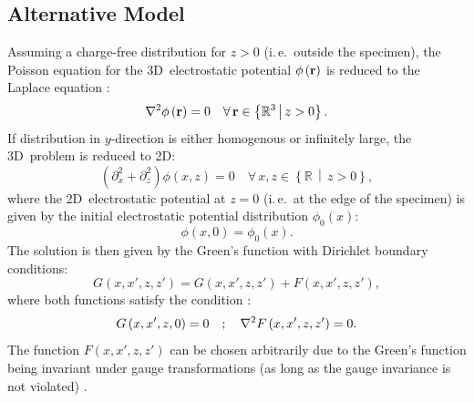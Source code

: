 \subsection{Alternative Model} \label{ssec:SIMP-alternative-model}
Assuming a charge-free distribution for $z > 0$ (i.\,e.\ outside the specimen), the Poisson equation for the 3D~electrostatic potential $\phi\left(\vb{r}\right)$ is reduced to the Laplace equation \cite{Jackson1999}:
\begin{equation}
  \laplacian{\phi\left(\vb{r}\right)} = 0 \quad \forall\, \vb{r} \in \left\{\mathbb{R}^3\, \middle| \, z > 0\right\}.
\end{equation}
If distribution in $y$-direction is either homogenous or infinitely large, the 3D~problem is reduced to 2D:
\begin{equation}
	\label{eq:poisson-equation-2D-approximation}
  \left(\partial^2_x + \partial^2_z\right)\phi\left(x, z \right) = 0 \quad \forall\, x, z \in \left\{\mathbb{R}\, \middle| \, z > 0\right\},
\end{equation}
where the 2D~electrostatic potential at $z = 0$ (i.\,e.\ at the edge of the specimen) is given by the initial electrostatic potential distribution $\phi_0 \left(x\right)$:
\begin{equation}
  \phi\left(x, 0\right) = \phi_0 \left(x\right).
\end{equation}
The solution is then given by the Green's function with Dirichlet boundary conditions:
\begin{equation}
  G\left(x, x', z, z'\right) = G\left(x, x', z, z'\right) + F\left(x, x', z, z'\right),
\end{equation}
where both functions satisfy the condition \cite{Jackson1999}:
\begin{equation}
  G\left(x, x', z, 0\right) = 0 \quad ; \quad \laplacian{F\left(x, x', z, z'\right)} = 0.
\end{equation}
The function $F\left(x, x', z, z'\right)$ can be chosen arbitrarily due to the Green's function being invariant under gauge transformations (as long as the gauge invariance is not violated) \cite{Jackson1999}.


